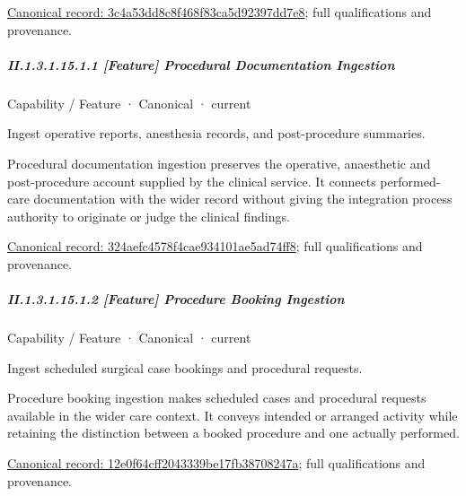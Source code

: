 {\footnotesize \href{../../../../../../../continuum/strategy/capability/3c4a53dd8c8f468f83ca5d92397dd7e8.md}{Canonical record: 3c4a53dd8c8f468f83ca5d92397dd7e8}; full qualifications and provenance.}\par
\subparagraph*{II.1.3.1.15.1.1 [Feature] Procedural Documentation Ingestion}
\label{navigation:II.1.3.1.15.1.1}

\label{element:324aefc4578f4cae934101ae5ad74ff8}
{\small Capability / Feature · Canonical · current}\par

Ingest operative reports, anesthesia records, and post-procedure summaries.



Procedural documentation ingestion preserves the operative, anaesthetic and post-procedure account supplied by the clinical service. It connects performed-care documentation with the wider record without giving the integration process authority to originate or judge the clinical findings.


{\footnotesize \href{../../../../../../../continuum/strategy/capability/feature/324aefc4578f4cae934101ae5ad74ff8.md}{Canonical record: 324aefc4578f4cae934101ae5ad74ff8}; full qualifications and provenance.}\par
\subparagraph*{II.1.3.1.15.1.2 [Feature] Procedure Booking Ingestion}
\label{navigation:II.1.3.1.15.1.2}

\label{element:12e0f64cff2043339be17fb38708247a}
{\small Capability / Feature · Canonical · current}\par

Ingest scheduled surgical case bookings and procedural requests.



Procedure booking ingestion makes scheduled cases and procedural requests available in the wider care context. It conveys intended or arranged activity while retaining the distinction between a booked procedure and one actually performed.


{\footnotesize \href{../../../../../../../continuum/strategy/capability/feature/12e0f64cff2043339be17fb38708247a.md}{Canonical record: 12e0f64cff2043339be17fb38708247a}; full qualifications and provenance.}\par
